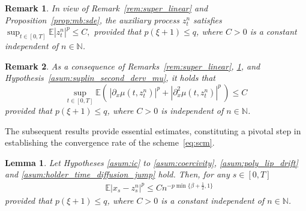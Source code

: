 \documentclass[reqno,  oneside, 12pt]{amsart}
\newtheorem{lemma}{Lemma}[section]
\newtheorem{remark}{Remark}[section]
\newcommand{\E}{\mathbb E}
\begin{document}
\begin{remark} \label{rem:mb_auxilary}
	In view of  Remark~\mbox{\normalfont\ref{rem:super_linear}} and Proposition~\mbox{\normalfont\ref{prop:mb:sde}},  the auxiliary process \( z_t^n \) satisfies   
	\(
	\sup_{t \in [0, T]} \mathbb{E}|z_t^n|^p \leq C,
	\)
	provided that \( p(\xi + 1) \leq q \), where \( C > 0 \) is a constant independent of \( n \in \mathbb{N} \).
\end{remark}
\begin{remark} \label{rem:mb_auxilary_derv}
	As a consequence of Remarks~\mbox{\normalfont\ref{rem:super_linear}}, \mbox{\normalfont\ref{rem:mb_auxilary}}, and Hypothesis~\mbox{\normalfont\ref{asum:suplin_second_derv_mu}}, it holds that
	\[
	\sup_{t \in [0,T]} \mathbb{E}\left(\, |\partial_x \mu(t, z_t^n)|^p + |\partial_x^2 \mu(t, z_t^n)|^p \,\right) \le C
	\]
	provided that \( p(\xi + 1) \leq q \),
	where \(C>0\) is independent of \(n\in\mathbb{N}\).
\end{remark}
The subsequent results provide essential estimates, constituting a pivotal step in establishing the convergence rate of the scheme~\eqref{eq:scm}.
\begin{lemma} \label{lem:estimate_first_term_MR}
	Let Hypotheses \mbox{\normalfont  \ref{asum:ic}} to \mbox{\normalfont \ref{asum:coercivity}}, \textnormal{\ref{asum:poly_lip_drift}} and \textnormal{\ref{asum:holder_time_diffusion_jump}} hold.
	Then, for any   $s\in[0,T]$ 
	\begin{align*}
		&\E|x_s-z_s^{n}|^{p}
		\leq  C  n^{-p\min\{\beta+\frac{1}{2},1\}} 
	\end{align*}
	provided that $p(\xi+1)\leq q$,	where $C>0$    is a constant independent of  $n\in \mathbb N$. 
\end{lemma}
\end{document}
